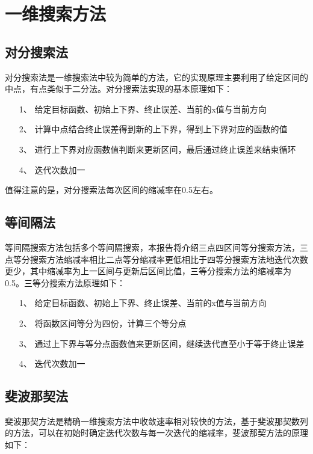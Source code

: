 \section{一维搜索方法}

\subsection{对分搜索法}
对分搜索法是一维搜索法中较为简单的方法，它的实现原理主要利用了给定区间的中点，有点类似于二分法。对分搜索法实现的基本原理如下：

\begin{itemize}
    \item[1、] 给定目标函数、初始上下界、终止误差、当前的x值与当前方向
    \item[2、] 计算中点结合终止误差得到新的上下界，得到上下界对应的函数的值
    \item[3、] 进行上下界对应函数值判断来更新区间，最后通过终止误差来结束循环
    \item[4、] 迭代次数加一
\end{itemize}

值得注意的是，对分搜索法每次区间的缩减率在0.5左右。

\subsection{等间隔法}
等间隔搜索方法包括多个等间隔搜索，本报告将介绍三点四区间等分搜索方法，三点等分搜索方法缩减率相比二点等分缩减率更低相比于四等分搜索方法地迭代次数更少，其中缩减率为上一区间与更新后区间比值，三等分搜索方法的缩减率为0.5。三等分搜索方法原理如下：

\begin{itemize}
    \item[1、] 给定目标函数、初始上下界、终止误差、当前的x值与当前方向
    \item[2、] 将函数区间等分为四份，计算三个等分点
    \item[3、] 通过上下界与等分点函数值来更新区间，继续迭代直至小于等于终止误差
    \item[4、] 迭代次数加一
\end{itemize}

\subsection{斐波那契法}
斐波那契方法是精确一维搜索方法中收敛速率相对较快的方法，基于斐波那契数列的方法，可以在初始时确定迭代次数与每一次迭代的缩减率，斐波那契方法的原理如下：

